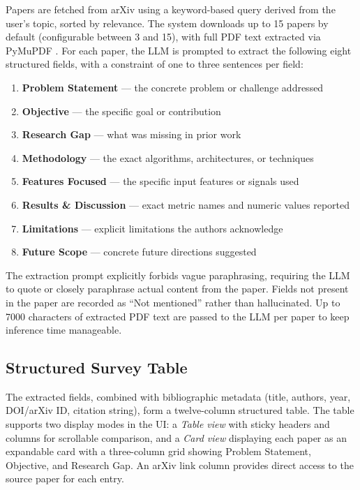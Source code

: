 \documentclass[12pt, a4paper]{article}
\begin{document}
Papers are fetched from arXiv using a keyword-based query derived from the user's
topic, sorted by relevance. The system downloads up to 15 papers by default
(configurable between 3 and 15), with full PDF text extracted via PyMuPDF
\cite{pymupdf2024}. For each paper, the LLM is prompted to extract the following
eight structured fields, with a constraint of one to three sentences per field:

\begin{enumerate}[noitemsep]
  \item \textbf{Problem Statement} --- the concrete problem or challenge addressed
  \item \textbf{Objective} --- the specific goal or contribution
  \item \textbf{Research Gap} --- what was missing in prior work
  \item \textbf{Methodology} --- the exact algorithms, architectures, or techniques
  \item \textbf{Features Focused} --- the specific input features or signals used
  \item \textbf{Results \& Discussion} --- exact metric names and numeric values reported
  \item \textbf{Limitations} --- explicit limitations the authors acknowledge
  \item \textbf{Future Scope} --- concrete future directions suggested
\end{enumerate}

The extraction prompt explicitly forbids vague paraphrasing, requiring the LLM to
quote or closely paraphrase actual content from the paper. Fields not present in
the paper are recorded as ``Not mentioned'' rather than hallucinated. Up to 7000
characters of extracted PDF text are passed to the LLM per paper to keep inference
time manageable.

\subsection{Structured Survey Table}

The extracted fields, combined with bibliographic metadata (title, authors, year,
DOI/arXiv ID, citation string), form a twelve-column structured table. The table
supports two display modes in the UI: a \textit{Table view} with sticky headers
and columns for scrollable comparison, and a \textit{Card view} displaying each
paper as an expandable card with a three-column grid showing Problem Statement,
Objective, and Research Gap. An arXiv link column provides direct access to the
source paper for each entry.
\end{document}
